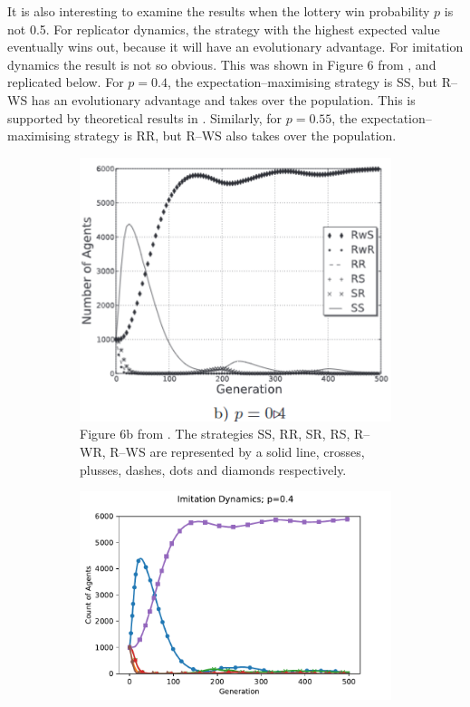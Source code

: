  It is also interesting to examine the results when the lottery win probability $p$ is not 0.5. For replicator dynamics, the strategy with the highest expected value eventually wins out, because it will have an evolutionary advantage. For imitation dynamics the result is not so obvious. This was shown in Figure 6 from \cite{RN30}, and replicated below. For $p=0.4$, the expectation--maximising strategy is SS, but R--WS has an evolutionary advantage and takes over the population. This is supported by theoretical results in \cite{RN30}. Similarly, for $p=0.55$, the expectation--maximising strategy is RR, but R--WS also takes over the population. \\
 
 \FloatBarrier 
\begin{figure}[!h]
  \begin{subfigure}[b]{0.45\textwidth}
    \includegraphics[width=\textwidth]{images/lotteryp4.png}
    \caption{Figure 6b from \cite{RN30}. The strategies SS, RR, SR, RS, R--WR, R--WS are represented by a solid line, crosses, plusses, dashes, dots and diamonds respectively.}
    \label{lotteryp4}
  \end{subfigure}
  \hfill
  \begin{subfigure}[b]{0.45\textwidth}
    \includegraphics[width=1.25\textwidth]{images/lotteryp4_me.pdf}

\end{subfigure}
\end{figure}
